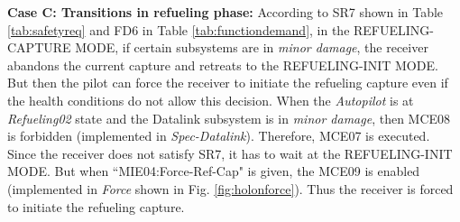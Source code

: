 \textbf{Case C: Transitions in refueling phase:} According to SR7 shown in Table \ref{tab:safetyreq} and FD6 in Table \ref{tab:functiondemand}, in the REFUELING-CAPTURE MODE, if certain subsystems are in \textit{minor damage},  the receiver abandons the current capture and retreats to the REFUELING-INIT MODE. But then the pilot can force the receiver to initiate the refueling capture even if the health conditions do not allow this decision. When the \textit{Autopilot} is at \textit{Refueling02} state and the Datalink subsystem is in \textit{minor damage}, then MCE08 is forbidden (implemented in \textit{Spec-Datalink}). Therefore, MCE07 is executed. Since the receiver does not satisfy SR7, it has to wait at the REFUELING-INIT MODE. But when ``MIE04:Force-Ref-Cap" is given, the MCE09 is enabled (implemented in \textit{Force} shown in Fig. \ref{fig:holonforce}). Thus the receiver is forced to initiate the refueling capture.  

\vfill
\setcounter{table}{2}
\renewcommand{\thetable}{A\arabic{table}}

